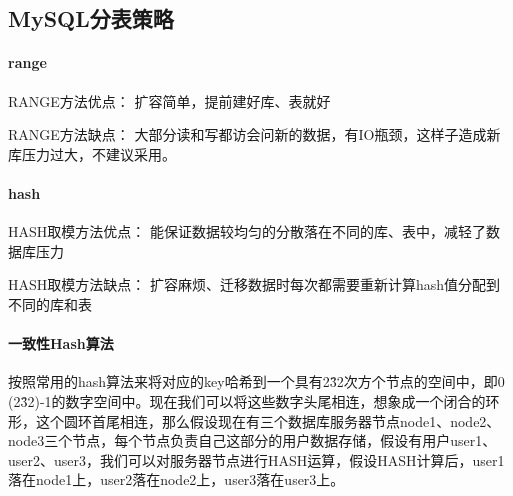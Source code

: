 \documentclass[../../../interview-questions.tex]{subfiles}
\begin{document}
\subsection{MySQL分表策略}

\paragraph{range}

RANGE方法优点： 扩容简单，提前建好库、表就好

RANGE方法缺点： 大部分读和写都访会问新的数据，有IO瓶颈，这样子造成新库压力过大，不建议采用。

\paragraph{hash}

HASH取模方法优点： 能保证数据较均匀的分散落在不同的库、表中，减轻了数据库压力

HASH取模方法缺点： 扩容麻烦、迁移数据时每次都需要重新计算hash值分配到不同的库和表

\paragraph{一致性Hash算法}

按照常用的hash算法来将对应的key哈希到一个具有2\^32次方个节点的空间中，即0~ (2\^32)-1的数字空间中。现在我们可以将这些数字头尾相连，想象成一个闭合的环形，这个圆环首尾相连，那么假设现在有三个数据库服务器节点node1、node2、node3三个节点，每个节点负责自己这部分的用户数据存储，假设有用户user1、user2、user3，我们可以对服务器节点进行HASH运算，假设HASH计算后，user1落在node1上，user2落在node2上，user3落在user3上。
\end{document}
